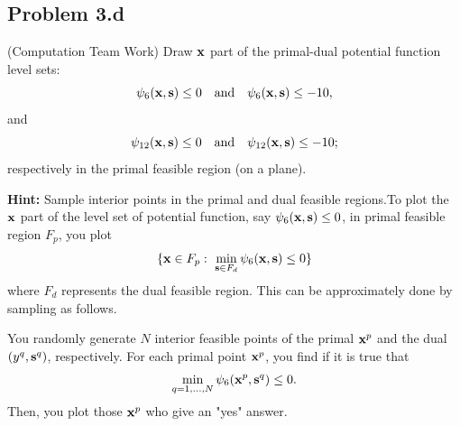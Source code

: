 \documentclass[answers]{exam}
\newcommand\x{{\bf x}}
\newcommand\s{{\bf s}}
\begin{document}
\subsection*{Problem 3.d }
(Computation Team Work) Draw $\x$ part of the primal-dual potential function level sets:
\[\psi_{6}(\x,\s)\le 0 \quad\mbox{and}\quad \psi_{6}(\x,\s)\le -10,\]
and
\[\psi_{12}(\x,\s)\le 0 \quad\mbox{and}\quad \psi_{12}(\x,\s)\le -10;\]
respectively in the primal feasible region (on a plane).

{\bf Hint:} Sample interior points in the primal and dual feasible regions.To plot the $\x$ part of the level set of potential function, say $\psi_{6}(\x,\s)\le 0$,
in primal feasible region $F_p$, you plot
\[\{\x\in F_p:\ \min_{\s\in F_d}\psi_{6}(\x,\s)\le 0\}\]
where $F_d$ represents the dual feasible region. This can be approximately done by sampling as follows.

You randomly generate $N$ interior feasible points of the primal $\x^p$ and the dual $(y^q,\s^q)$, respectively. For 
each primal point $\x^p$, you find if it is true that
\[\min_{q=1,...,N}\psi_{6}(\x^p,\s^q)\le 0.\]
Then, you plot those $\x^p$ who give an "yes" answer.
\end{document}
